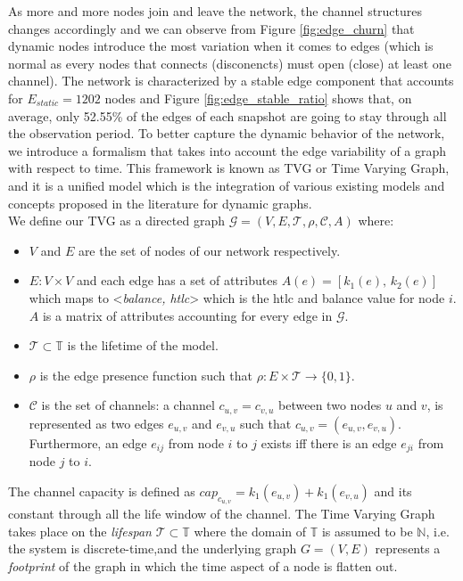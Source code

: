 	As more and more nodes join and leave the network, the channel structures changes accordingly and we can observe from Figure \ref{fig:edge_churn} that dynamic nodes introduce the most variation when it comes to edges (which is normal as every nodes that connects (disconencts) must open (close) at least one channel). The network is characterized by a stable edge component that accounts for $E_{static} = 1202$ nodes and Figure \ref{fig:edge_stable_ratio} shows that, on average,  only 52.55\% of the edges of each snapshot are going to stay through all the observation period.	To better capture the dynamic behavior of the network, we introduce a formalism that takes into account the edge variability of a graph with respect to time. This framework is known as TVG or Time Varying Graph, and it is a unified model which is the integration of various existing models and concepts proposed in the literature for dynamic graphs. \\
	We define our TVG as a directed graph $\mathcal{G} = (V, E, \mathcal{T}, \rho, \mathcal{C}, A)$ where:
	\begin{itemize}
		\item $V$ and $E$ are the set of nodes of our network respectively. 
		\item $E: V \times V$ and each edge has a set of attributes $A(e) = [k_1(e),\, k_2(e)]$ which maps to <\textit{balance, htlc}> which is the htlc and balance value for node $i$. $A$ is a matrix of attributes accounting for every edge in $\mathcal{G}$.
		\item $\mathcal{T} \subset \mathbb{T}$ is the lifetime of the model.
		\item $\rho$ is the edge presence function such that $\rho: E \times \mathcal{T} \to \{0,1\}$.
		\item $\mathcal{C}$ is the set of channels: a channel $c_{u,v} = c_{v,u}$ between two nodes $u$ and $v$, is represented as two edges $e_{u,v}$ and $e_{v,u}$ such that $c_{u,v} = (e_{u,v}, e_{v,u})$. Furthermore, an edge $e_{ij}$ from node $i$ to $j$ exists iff there is an edge $e_{ji}$  from node $j$ to $i$.
	\end{itemize}
	
	The channel capacity is defined as $cap_{c_{u,v}} = k_1(e_{u,v}) + k_1(e_{v,u})$ and its constant through all the life window of the channel.
	The Time Varying Graph takes place on the \textit{lifespan} $\mathcal{T}  \subset \mathbb{T}$ where the domain of $\mathbb{T}$ is assumed to be $\mathbb{N}$, i.e. the system is discrete-time,and the underlying graph $G = (V, E)$ represents a \textit{footprint} of the graph in which the time aspect of a node is flatten out. 
	
